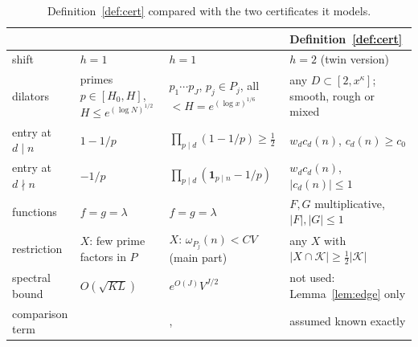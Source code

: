 \documentclass[11pt]{amsart}
\theoremstyle{definition}
\theoremstyle{remark}
\begin{document}
\begin{table}[h]
\centering
\small
\begin{tabular}{p{2.6cm}p{3.6cm}p{3.6cm}p{3.6cm}}
\toprule
 & \cite{HR21} & \cite{Pil23} & Definition~\ref{def:cert}\\
\midrule
shift & $h=1$ & $h=1$ & $h=2$ (twin version)\\
dilators & primes $p\in[H_0,H]$, $H\le e^{(\log N)^{1/2}}$ & $p_1\cdots p_J$, $p_j\in P_j$, all $<H=e^{(\log x)^{1/6}}$ & any $D\subset[2,x^\kappa]$; smooth, rough or mixed\\
entry at $d\mid n$ & $1-1/p$ & $\prod_{p\mid d}(1-1/p)\ge\frac12$ & $w_dc_d(n)$, $c_d(n)\ge c_0$\\
entry at $d\nmid n$ & $-1/p$ & $\prod_{p\mid d}(\mathbf 1_{p\mid n}-1/p)$ & $w_dc_d(n)$, $|c_d(n)|\le1$\\
functions & $f=g=\lambda$ & $f=g=\lambda$ & $F,G$ multiplicative, $|F|,|G|\le1$\\
restriction & $X$: few prime factors in $P$ & $X$: $\omega_{P_j}(n)<CV$ (main part) & any $X$ with $|X\cap\mathcal K|\ge\frac12|\mathcal K|$\\
spectral bound & $O(\sqrt{KL})$ & $e^{O(J)}V^{J/2}$ & not used: Lemma~\ref{lem:edge} only\\
comparison term & \cite{MR16} & \cite[Prop.~3.1]{Pil23}, \cite{MRT15} & assumed known exactly\\
\bottomrule
\end{tabular}
\caption{Definition~\ref{def:cert} compared with the two certificates it models.}
\label{tab:certs}
\end{table}
\end{document}
